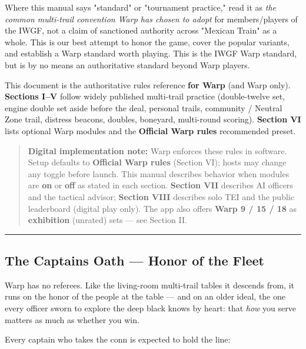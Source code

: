 \documentclass[11pt]{article}
\begin{document}
Where this manual says "standard" or "tournament practice," read it as
\emph{the common multi-trail convention Warp has chosen to adopt} for
members/players of the IWGF, not a claim of sanctioned authority across
"Mexican Train" as a whole. This is our best attempt to honor the game,
cover the popular variants, and establish a Warp standard worth playing.
This is the IWGF Warp standard, but is by no means an authoritative
standard beyond Warp players.

This document is the authoritative rules reference \textbf{for Warp}
(and Warp only). \textbf{Sections I--V} follow widely published
multi-trail practice (double-twelve set, engine double set aside before
the deal, personal trails, community / Neutral Zone trail, distress
beacons, doubles, boneyard, multi-round scoring). \textbf{Section VI}
lists optional Warp modules and the \textbf{Official Warp rules}
recommended preset.

\begin{quote}
\textbf{Digital implementation note:} Warp enforces these rules in
software. Setup defaults to \textbf{Official Warp rules} (Section VI);
hosts may change any toggle before launch. This manual describes
behavior when modules are \textbf{on} or \textbf{off} as stated in each
section. \textbf{Section VII} describes AI officers and the tactical
advisor; \textbf{Section VIII} describes solo TEI and the public
leaderboard (digital play only). The app also offers \textbf{Warp 9 / 15
/ 18} as \textbf{exhibition} (unrated) sets --- see Section II.
\end{quote}

\begin{center}\rule{0.5\linewidth}{0.5pt}\end{center}

\subsection{The Captain\textquotesingle s Oath --- Honor of the
Fleet}\label{the-captains-oath--honor-of-the-fleet}

Warp has no referees. Like the living-room multi-trail tables it
descends from, it runs on the honor of the people at the table --- and
on an older ideal, the one every officer sworn to explore the deep black
knows by heart: that \emph{how} you serve matters as much as whether you
win.

Every captain who takes the conn is expected to hold the line:
\end{document}
